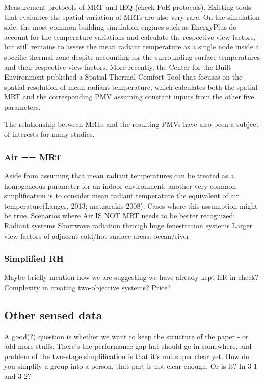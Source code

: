             Measurement protocols of MRT and IEQ (check PoE protocols).
    Existing tools that evaluates the spatial variation of MRTs are also very rare. On the simulation side, the most common building simulation engines such as EnergyPlus \cite{energyplus_engineering_2013} do account for the temperature variations and calculate the respective view factors, but still remains to assess the mean radiant temperature as a single node inside a specific thermal zone despite accounting for the surrounding surface temperatures and their respective view factors. More recently, the Center for the Built Environment published a Spatial Thermal Comfort Tool \cite{arens_modeling_2015} that focuses on the spatial resolution of mean radiant temperature, which calculates both the spatial MRT and the corresponding PMV assuming constant inputs from the other five parameters.  
    
            The relationship between MRTs and the resulting PMVs have also been a subject of interests for many studies. 
\subsubsection{Air == MRT}
    Aside from assuming that mean radiant temperatures can be treated as a homogeneous parameter for an indoor environment, another very common simplification is to consider mean radiant temperature the equivalent of air temperature\cite{kantor_most_2011,}(Langer, 2013; matzarakis 2008). 
            Cases where this assumption might be true.
            Scenarios where Air IS NOT MRT needs to be better recognized:
            Radiant systems
            Shortwave radiation through huge fenestration systems
            Larger view-factors of adjacent cold/hot surface areas: ocean/river
\subsubsection{Simplified RH}
            Maybe briefly mention how we are suggesting we have already kept HR in check?
            Complexity in creating two-objective systems? Price?
\subsection{Other sensed data}
    A good(?) question is whether we want to keep the structure of the paper - or add more stuffs. There's the performance gap hat should go in somewhere, and problem of the two-stage simplification is that it's not super clear yet. How do you simplify a group into a person, that part is not clear enough. Or is it? In 3-1 and 3-2?
